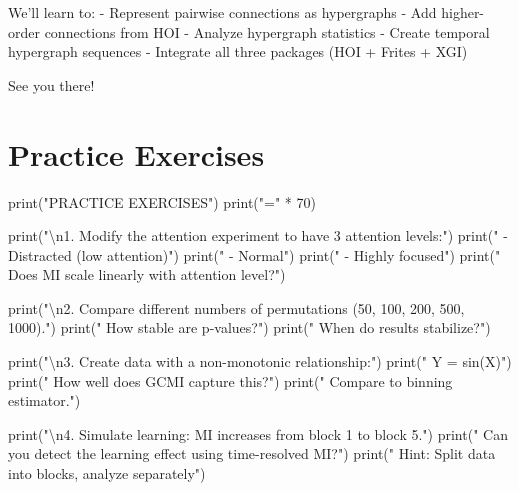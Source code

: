 \documentclass[
  11pt,
  letterpaper,
  oneside,
  openany]{book}
\newenvironment{Shaded}{\begin{snugshade}}{\end{snugshade}}
\newcommand{\BuiltInTok}[1]{\textcolor[rgb]{0.00,0.23,0.31}{#1}}
\newcommand{\CharTok}[1]{\textcolor[rgb]{0.13,0.47,0.30}{#1}}
\newcommand{\DecValTok}[1]{\textcolor[rgb]{0.68,0.00,0.00}{#1}}
\newcommand{\NormalTok}[1]{\textcolor[rgb]{0.00,0.23,0.31}{#1}}
\newcommand{\OperatorTok}[1]{\textcolor[rgb]{0.37,0.37,0.37}{#1}}
\newcommand{\StringTok}[1]{\textcolor[rgb]{0.13,0.47,0.30}{#1}}
\begin{document}
We'll learn to: - Represent pairwise connections as hypergraphs - Add
higher-order connections from HOI - Analyze hypergraph statistics -
Create temporal hypergraph sequences - Integrate all three packages (HOI
+ Frites + XGI)

See you there! 🚀

\section{Practice Exercises}\label{practice-exercises-2}

\begin{Shaded}
\begin{Highlighting}[]
\BuiltInTok{print}\NormalTok{(}\StringTok{"PRACTICE EXERCISES"}\NormalTok{)}
\BuiltInTok{print}\NormalTok{(}\StringTok{"="} \OperatorTok{*} \DecValTok{70}\NormalTok{)}

\BuiltInTok{print}\NormalTok{(}\StringTok{"}\CharTok{\textbackslash{}n}\StringTok{1. Modify the attention experiment to have 3 attention levels:"}\NormalTok{)}
\BuiltInTok{print}\NormalTok{(}\StringTok{"   {-} Distracted (low attention)"}\NormalTok{)}
\BuiltInTok{print}\NormalTok{(}\StringTok{"   {-} Normal"}\NormalTok{)}
\BuiltInTok{print}\NormalTok{(}\StringTok{"   {-} Highly focused"}\NormalTok{)}
\BuiltInTok{print}\NormalTok{(}\StringTok{"   Does MI scale linearly with attention level?"}\NormalTok{)}

\BuiltInTok{print}\NormalTok{(}\StringTok{"}\CharTok{\textbackslash{}n}\StringTok{2. Compare different numbers of permutations (50, 100, 200, 500, 1000)."}\NormalTok{)}
\BuiltInTok{print}\NormalTok{(}\StringTok{"   How stable are p{-}values?"}\NormalTok{)}
\BuiltInTok{print}\NormalTok{(}\StringTok{"   When do results stabilize?"}\NormalTok{)}

\BuiltInTok{print}\NormalTok{(}\StringTok{"}\CharTok{\textbackslash{}n}\StringTok{3. Create data with a non{-}monotonic relationship:"}\NormalTok{)}
\BuiltInTok{print}\NormalTok{(}\StringTok{"   Y = sin(X)"}\NormalTok{)}
\BuiltInTok{print}\NormalTok{(}\StringTok{"   How well does GCMI capture this?"}\NormalTok{)}
\BuiltInTok{print}\NormalTok{(}\StringTok{"   Compare to binning estimator."}\NormalTok{)}

\BuiltInTok{print}\NormalTok{(}\StringTok{"}\CharTok{\textbackslash{}n}\StringTok{4. Simulate learning: MI increases from block 1 to block 5."}\NormalTok{)}
\BuiltInTok{print}\NormalTok{(}\StringTok{"   Can you detect the learning effect using time{-}resolved MI?"}\NormalTok{)}
\BuiltInTok{print}\NormalTok{(}\StringTok{"   Hint: Split data into blocks, analyze separately"}\NormalTok{)}


\end{Highlighting}
\end{Shaded}
\end{document}
